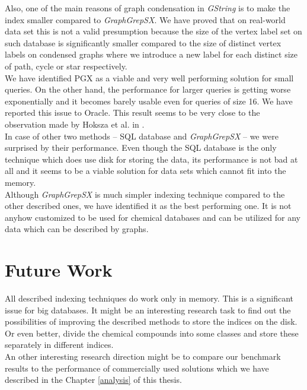 Also, one of the main reasons of graph condensation in \textit{GString} is to make the index smaller compared to \textit{GraphGrepSX}. We have proved that on real-world data set this is not a valid presumption because the size of the vertex label set on such database is significantly smaller compared to the size of distinct vertex labels on condensed graphs where we introduce a new label for each distinct size of path, cycle or star respectively.\\

We have identified PGX as a viable and very well performing solution for small queries. On the other hand, the performance for larger queries is getting worse exponentially and it becomes barely usable even for queries of size 16. We have reported this issue to Oracle. This result seems to be very close to the observation made by Hoksza et al. in \cite{Hoksza}.\\

In case of other two methods -- SQL database and \textit{GraphGrepSX} -- we were surprised by their performance. Even though the SQL database is the only technique which does use disk for storing the data, its performance is not bad at all and it seems to be a viable solution for data sets which cannot fit into the memory.\\

Although \textit{GraphGrepSX} is much simpler indexing technique compared to the other described ones, we have identified it as the best performing one. It is not anyhow customized to be used for chemical databases and can be utilized for any data which can be described by graphs.

\section*{Future Work}
All described indexing techniques do work only in memory. This is a significant issue for big databases. It might be an interesting research task to find out the possibilities of improving the described methods to store the indices on the disk. Or even better, divide the chemical compounds into some classes and store these separately in different indices.\\

An other interesting research direction might be to compare our benchmark results to the performance of commercially used solutions which we have described in the Chapter \ref{analysis} of this thesis. 

 
